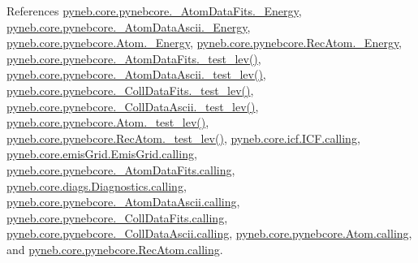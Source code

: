 References \hyperlink{pynebcore_8py_source_l00094}{pyneb.\+core.\+pynebcore.\+\_\+\+Atom\+Data\+Fits.\+\_\+\+Energy}, \hyperlink{pynebcore_8py_source_l00400}{pyneb.\+core.\+pynebcore.\+\_\+\+Atom\+Data\+Ascii.\+\_\+\+Energy}, \hyperlink{pynebcore_8py_source_l01257}{pyneb.\+core.\+pynebcore.\+Atom.\+\_\+\+Energy}, \hyperlink{pynebcore_8py_source_l02586}{pyneb.\+core.\+pynebcore.\+Rec\+Atom.\+\_\+\+Energy}, \hyperlink{pynebcore_8py_source_l00171}{pyneb.\+core.\+pynebcore.\+\_\+\+Atom\+Data\+Fits.\+\_\+test\+\_\+lev()}, \hyperlink{pynebcore_8py_source_l00435}{pyneb.\+core.\+pynebcore.\+\_\+\+Atom\+Data\+Ascii.\+\_\+test\+\_\+lev()}, \hyperlink{pynebcore_8py_source_l00660}{pyneb.\+core.\+pynebcore.\+\_\+\+Coll\+Data\+Fits.\+\_\+test\+\_\+lev()}, \hyperlink{pynebcore_8py_source_l01026}{pyneb.\+core.\+pynebcore.\+\_\+\+Coll\+Data\+Ascii.\+\_\+test\+\_\+lev()}, \hyperlink{pynebcore_8py_source_l01459}{pyneb.\+core.\+pynebcore.\+Atom.\+\_\+test\+\_\+lev()}, \hyperlink{pynebcore_8py_source_l02596}{pyneb.\+core.\+pynebcore.\+Rec\+Atom.\+\_\+test\+\_\+lev()}, \hyperlink{icf_8py_source_l00016}{pyneb.\+core.\+icf.\+I\+C\+F.\+calling}, \hyperlink{emis_grid_8py_source_l00041}{pyneb.\+core.\+emis\+Grid.\+Emis\+Grid.\+calling}, \hyperlink{pynebcore_8py_source_l00090}{pyneb.\+core.\+pynebcore.\+\_\+\+Atom\+Data\+Fits.\+calling}, \hyperlink{diags_8py_source_l00169}{pyneb.\+core.\+diags.\+Diagnostics.\+calling}, \hyperlink{pynebcore_8py_source_l00311}{pyneb.\+core.\+pynebcore.\+\_\+\+Atom\+Data\+Ascii.\+calling}, \hyperlink{pynebcore_8py_source_l00568}{pyneb.\+core.\+pynebcore.\+\_\+\+Coll\+Data\+Fits.\+calling}, \hyperlink{pynebcore_8py_source_l00918}{pyneb.\+core.\+pynebcore.\+\_\+\+Coll\+Data\+Ascii.\+calling}, \hyperlink{pynebcore_8py_source_l01175}{pyneb.\+core.\+pynebcore.\+Atom.\+calling}, and \hyperlink{pynebcore_8py_source_l02572}{pyneb.\+core.\+pynebcore.\+Rec\+Atom.\+calling}.


